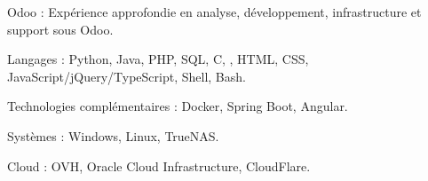 \begin{indentsection}{\parindent}
  \begin{description*}
    \item[Odoo :] Expérience approfondie en analyse, développement, infrastructure et support sous Odoo.
    \item[Langages :] Python, Java, PHP, SQL, C, \Csharp, HTML, CSS, JavaScript/jQuery/TypeScript, Shell, Bash.
    \item[Technologies complémentaires :] Docker, Spring Boot, Angular.
    \item[Systèmes :] Windows, Linux, TrueNAS.
    \item[Cloud :] OVH, Oracle Cloud Infrastructure, CloudFlare.

  \end{description*}
\end{indentsection}
